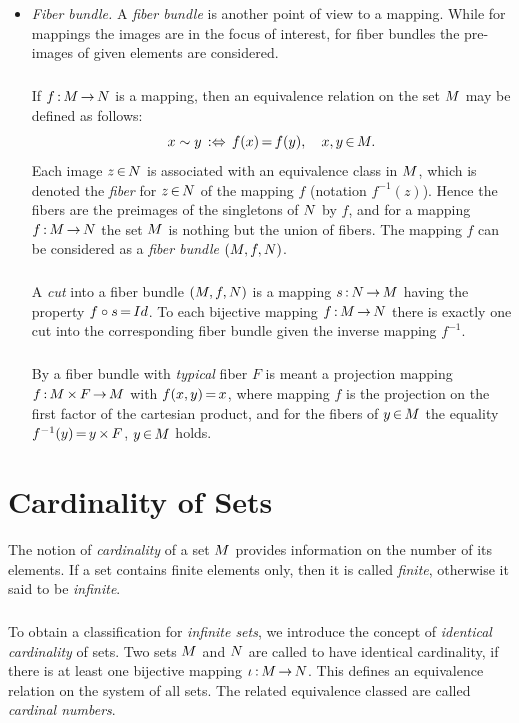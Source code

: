 \documentclass[11pt,twoside]{article}
\begin{document}
\begin{itemize}[leftmargin=15pt]
\item[11.] \textit{Fiber bundle.}
A \textit{fiber bundle} is another point of view to a mapping.
While for mappings the images are in the focus of interest,
for fiber bundles the pre-images of given elements are considered.

\subparagraph{}
If $f {\,:\,} M {\,\to\,} N$ is a mapping, 
then an equivalence relation on the set $M$ may be defined as follows:
\[
x \sim y \, :\Leftrightarrow \, f(x) {\,=\,} f(y), \quad x,y {\,\in\,} M.
\]
Each image $z {\,\in\,} N$ is associated with an equivalence class in $M$,
which is denoted the \textit{fiber} for $z {\,\in\,} N$ of the mapping $f$
(notation $f^{-1}(z)$).
Hence the fibers are the preimages of the singletons of $N$ by $f$,
and for a mapping $f {\,:\,} M {\,\to\,} N$
the set $M$ is nothing but the union of fibers.
The mapping $f$ can be considered as a \textit{fiber bundle} $(M,f,N)$.

\subparagraph{}
A \textit{cut} into a fiber bundle $(M,f,N)$ is a mapping
$s {\,:\,} N {\,\to\,} M$ having the property $f \circ s {\,=\,} Id$.
To each bijective mapping $f {\,:\,} M {\,\to\,}  N$ there is exactly
one cut into the corresponding fiber bundle
given the inverse mapping $f^{-1}$.

\subparagraph{}
By a fiber bundle with \textit{typical} fiber $F$ is meant
a projection mapping $f {\,:\,} M {\,\times\,} F {\,\to\,} M$ with $f(x,y) {\,=\,} x$,
where mapping $f$ is the projection on the first factor
of the cartesian product,
and for the fibers of $y {\,\in\,} M$ the equality
$f^{-1}(y) {\,=\,} y {\,\times\,} F$, $y {\,\in\,} M$ holds.
\end{itemize}

\section{Cardinality of Sets}
The notion of \textit{cardinality} of a set $M$ provides information
on the number of its elements.
If a set contains finite elements only,
then it is called \textit{finite},
otherwise it said to be \textit{infinite}.

\subparagraph{}
To obtain a classification for \textit{infinite sets},
we introduce the concept of \textit{identical cardinality} of sets.
Two sets $M$ and $N$ are called to have {identical cardinality}, 
if there is at least one bijective mapping $\iota {\,:\,} M {\,\to\,} N$.
This defines an equivalence relation on the system of all sets.
The related equivalence classed are called \textit{cardinal numbers}.
\end{document}
